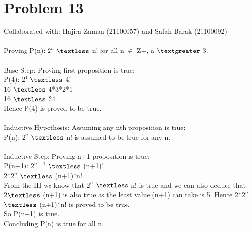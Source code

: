 \documentclass{article}
\begin{document}
\section{Problem 13}
Collaborated with:  Hajira Zaman (21100057) and Safah Barak (21100092)\\\\
Proving P(n): $2^{n}$ $\textless$ n! for all n $\in$ Z+, n $\textgreater$ 3. \\\\
Base Step: Proving first proposition is true:\\
P(4): $2^{4}$ $\textless$ 4!\\
16 $\textless$ 4*3*2*1 \\
16 $\textless$ 24\\
Hence P(4) is proved to be true. \\\\
Inductive Hypothesis: Assuming any nth proposition is true:\\
P(n): $2^{n}$ $\textless$ n! is assumed to be true for any n.\\\\
Inductive Step: Proving  n+1 proposition is true:\\
P(n+1): $2^{n+1}$ $\textless$ (n+1)!\\
2*$2^{n}$ $ \textless$ (n+1)*n!\\
From the IH we know that $2^{n}$ $\textless$ n! is true and we can also deduce that 2$\textless$ (n+1) is also true as the least value (n+1) can take is 5. Hence 2*$2^{n}$ $ \textless$ (n+1)*n! is proved to be true.\\
So P(n+1) is true. \\
Concluding P(n) is true for all n.\\
\end{document}
